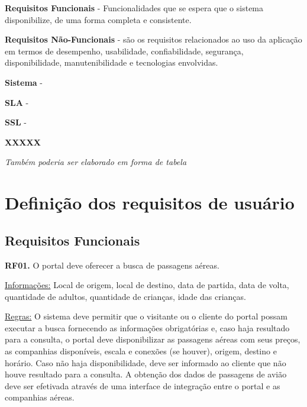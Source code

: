 \documentclass[12pt,a4paper]{article}
\begin{document}
\textbf{Requisitos Funcionais} - Funcionalidades que se espera que o sistema disponibilize, de uma forma completa e consistente.

\textbf{Requisitos Não-Funcionais} - são os requisitos relacionados ao uso da aplicação em termos de desempenho, usabilidade, confiabilidade, segurança, disponibilidade, manutenibilidade e tecnologias envolvidas.
 
\textbf{Sistema} -  

\textbf{SLA} - 
 
\textbf{SSL} - 
 
\textbf{XXXXX}

\textit{Também poderia ser elaborado em forma de tabela}

\section{Definição dos requisitos de usuário}
\subsection{Requisitos Funcionais}

\textbf{RF01.} O portal deve oferecer a busca de passagens aéreas.

\underline{Informações:} Local de origem, local de destino, data de partida, data de volta, quantidade  de adultos, quantidade de crianças, idade das crianças.

\underline{Regras:} O sistema deve permitir que o visitante ou o cliente do portal possam executar a busca fornecendo as informações obrigatórias e, caso haja resultado para a consulta, o portal deve disponibilizar as passagens aéreas com seus preços, as companhias disponíveis, escala e conexões (se houver), origem, destino e horário. Caso não haja disponibilidade, deve ser informado ao cliente que não houve resultado para a consulta. A obtenção dos dados de passagens de avião deve ser efetivada através de uma interface de integração entre o portal e as companhias aéreas.
\end{document}
